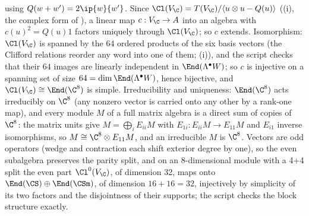using $Q(w+w') = 2\ip{w}{w'}$. Since $\Cl(V_\C) = T(V_\C)/\langle u\otimes u - Q(u)\rangle$ ((i), the complex form of ), a linear map $c: V_\C \to A$ into an algebra with $c(u)^2 = Q(u)1$ factors uniquely through $\Cl(V_\C)$; so $c$ extends. Isomorphism: $\Cl(V_\C)$ is spanned by the $64$ ordered products of the six basis vectors (the Clifford relations reorder any word into one of them; (i)), and the script checks that their $64$ images are linearly independent in $\End(\Lambda^\bullet W)$; so $c$ is injective on a spanning set of size $64 = \dim \End(\Lambda^\bullet W)$, hence bijective, and $\Cl(V_\C) \cong \End(\C^8)$ is simple. Irreducibility and uniqueness: $\End(\C^8)$ acts irreducibly on $\C^8$ (any nonzero vector is carried onto any other by a rank-one map), and every module $M$ of a full matrix algebra is a direct sum of copies of $\C^8$: the matrix units give $M = \bigoplus_i E_{ii}M$ with $E_{1i}: E_{ii}M \to E_{11}M$ and $E_{i1}$ inverse isomorphisms, so $M \cong \C^8 \otimes E_{11}M$, and an irreducible $M$ is $\C^8$. Vectors are odd operators (wedge and contraction each shift exterior degree by one), so the even subalgebra preserves the parity split, and on an 8-dimensional module with a 4+4 split the even part $\Cl^0(V_\C)$, of dimension 32, maps onto $\End(\CS)\oplus\End(\CSm)$, of dimension $16 + 16 = 32$, injectively by simplicity of its two factors and the disjointness of their supports; the script checks the block structure exactly.
